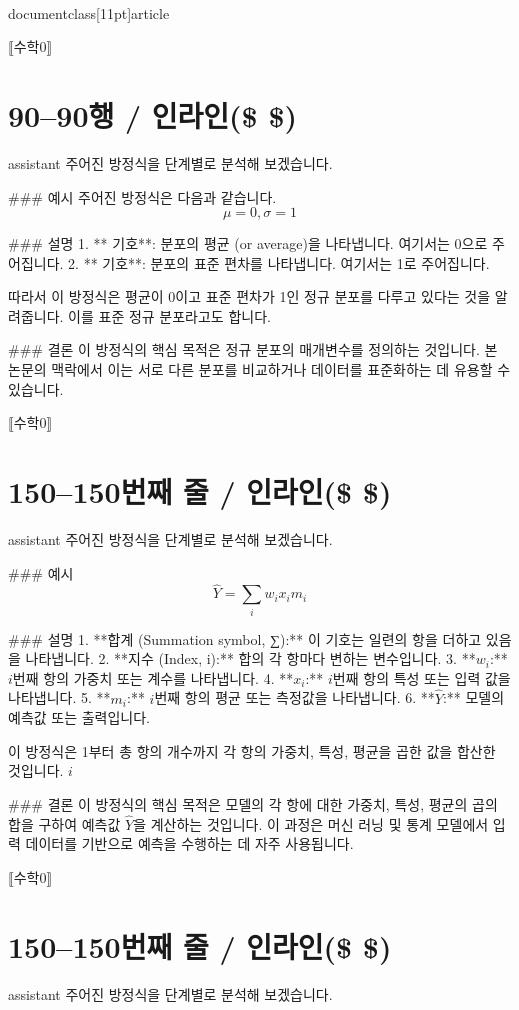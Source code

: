 \\documentclass[11pt]{article}
\begin{document}
⟦수학0⟧

\section*{90–90행 / 인라인(\$ \$) }
assistant
주어진 방정식을 단계별로 분석해 보겠습니다.

### 예시
주어진 방정식은 다음과 같습니다.
\[
\mu = 0, \sigma = 1
\]

### 설명
1. ** 기호**: 분포의 평균 (or average)을 나타냅니다. 여기서는 0으로 주어집니다.
2. ** 기호**: 분포의 표준 편차를 나타냅니다. 여기서는 1로 주어집니다.

따라서 이 방정식은 평균이 0이고 표준 편차가 1인 정규 분포를 다루고 있다는 것을 알려줍니다. 이를 표준 정규 분포라고도 합니다.

### 결론
이 방정식의 핵심 목적은 정규 분포의 매개변수를 정의하는 것입니다. 본 논문의 맥락에서 이는 서로 다른 분포를 비교하거나 데이터를 표준화하는 데 유용할 수 있습니다.

⟦수학0⟧

\section*{150–150번째 줄 / 인라인(\$ \$) }
assistant
주어진 방정식을 단계별로 분석해 보겠습니다.

### 예시
\[
\hat{Y} = \sum_i w_i x_i m_i
\]

### 설명
1. **합계 (Summation symbol, ∑):** 이 기호는 일련의 항을 더하고 있음을 나타냅니다.
2. **지수 (Index, i):** 합의 각 항마다 변하는 변수입니다.
3. **\( w_i \):** \(i\)번째 항의 가중치 또는 계수를 나타냅니다.
4. **\( x_i \):** \(i\)번째 항의 특성 또는 입력 값을 나타냅니다.
5. **\( m_i \):** \(i\)번째 항의 평균 또는 측정값을 나타냅니다.
6. **\( \hat{Y} \):** 모델의 예측값 또는 출력입니다.

이 방정식은 1부터 총 항의 개수까지 각 항의 가중치, 특성, 평균을 곱한 값을 합산한 것입니다. \(i\)

### 결론
이 방정식의 핵심 목적은 모델의 각 항에 대한 가중치, 특성, 평균의 곱의 합을 구하여 예측값 \(\hat{Y}\)을 계산하는 것입니다. 이 과정은 머신 러닝 및 통계 모델에서 입력 데이터를 기반으로 예측을 수행하는 데 자주 사용됩니다.

⟦수학0⟧

\section*{150–150번째 줄 / 인라인(\$ \$) }
assistant
주어진 방정식을 단계별로 분석해 보겠습니다.
\end{document}
